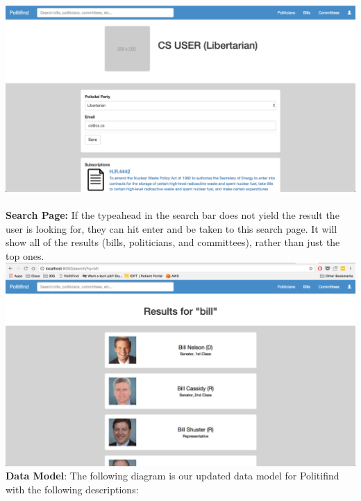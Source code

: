 \documentclass{article}
\newcommand{\n}{\noindent}
\begin{document}
\includegraphics[width=6in]{profile}\\\\
\textbf{Search Page:} If the typeahead in the search bar does not yield the result the user is looking for, they can hit enter and be taken to this search page.  It will show all of the results (bills, politicians, and committees), rather than just the top ones. \\

\includegraphics[width=6in]{search}\\





\n\textbf{Data Model}: The following diagram is our updated data model for Politifind with the following descriptions: \\ 
\end{document}
